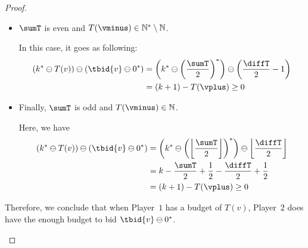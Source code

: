 \documentclass{theoretics}
\newcommand{\PO}{Player~$1$\xspace}
\newcommand{\PT}{Player~$2$\xspace}
\newcommand{\Nat}{\mathbb{N}}
\newcommand{\Natstro}{\mathbb{N}^* \setminus \mathbb{N}}
\newcommand{\predb}[1]{#1 \ominus 0^*\xspace}
\newcommand{\succInt}[1]{\left(#1\right)^*}
\DeclarePairedDelimiter{\adjustfloor}{\lfloor}{\rfloor}
\newcommand{\floor}[1]{\adjustfloor*{#1}}
\newcommand{\adjustbrac}[1]{\left(#1\right)}
\newcommand{\absolut}[1]{|#1|}
\newcommand{\half}[1]{\frac{#1}{2}}
\begin{document}
\begin{proof}
\begin{subproof}
\begin{itemize}
	In this case, we have 
	\begin{align*}
		\adjustbrac{k^* \ominus T(v)} \ominus (\predb{\tbid{v}}) &= \adjustbrac{k^* \ominus \adjustbrac{\floor{\half{\sumT}}+1}} \ominus \succInt{\floor{\half{\diffT}} -1}\\
		&= k - \floor{\half{\sumT}} - 1 - \floor{\half{\diffT}} + 1\\
		&= k+1 - \adjustbrac{\half{\sumT} + \half{\diffT}}\\
		&= \adjustbrac{k+1} - \absolut{T(\vplus)} \geq 0
	\end{align*}

	\item \(\sumT\) is even and \(T(\vminus) \in \Natstro\). 
	
	In this case, it goes as following:
	\begin{align*}
		\adjustbrac{k^* \ominus T(v)} \ominus (\predb{\tbid{v}}) &=
		\adjustbrac{k^* \ominus \succInt{\half{\sumT}}} \ominus \adjustbrac{\half{\diffT} -1}\\
		&= \adjustbrac{k+1} - T(\vplus) \geq 0
	\end{align*}

	\item Finally, \(\sumT\) is odd and \(T(\vminus) \in \Nat\). 
	
	Here, we have
	\begin{align*}
		\adjustbrac{k^* \ominus T(v)} \ominus (\predb{\tbid{v}}) &=
		\adjustbrac{k^* \ominus \succInt{\floor{\half{\sumT}}}} \ominus \floor{\half{\diffT}}\\
		&= k - \half{\sumT} + \half{1} - \half{\diffT} + \half{1}\\
		&= \adjustbrac{k+1} - T(\vplus) \geq 0
	\end{align*}
	\end{itemize}
Therefore, we conclude that when \PO has a budget of \(T(v)\), \PT does have the enough budget to bid \(\predb{\tbid{v}}\).
\end{subproof}
 

\end{proof}
\end{document}
